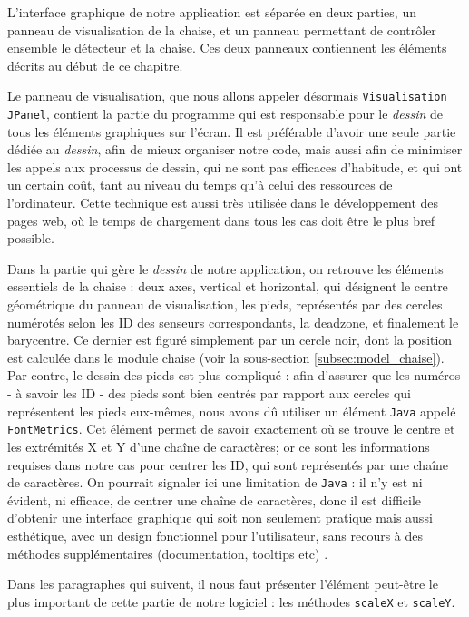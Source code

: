 \documentclass{polytech/polytech}
\begin{document}
L'interface graphique de notre application est séparée en deux parties, un panneau de visualisation de la chaise, et un panneau permettant de contrôler ensemble le détecteur et la chaise. Ces deux panneaux contiennent les éléments décrits au début de ce chapitre.

Le panneau de visualisation, que nous allons appeler désormais \texttt{Visualisation JPanel}, contient la partie du programme qui est responsable pour le \textit{dessin} de tous les éléments graphiques sur l'écran. Il est préférable d'avoir une seule partie dédiée au \textit{dessin}, afin de mieux organiser notre code, mais aussi afin de minimiser les appels aux processus de dessin, qui ne sont pas efficaces d’habitude, et qui ont un certain coût, tant au niveau du temps qu’à celui des ressources de l'ordinateur. Cette technique est aussi très utilisée dans le développement des pages web, où le temps de chargement dans tous les cas doit être le plus bref possible.

Dans la partie qui gère le \textit{dessin} de notre application, on retrouve les éléments essentiels de la chaise : deux axes, vertical et horizontal, qui désignent le centre géométrique du panneau de visualisation, les pieds, représentés par des cercles numérotés selon les ID des senseurs correspondants, la deadzone, et finalement le barycentre. Ce dernier est figuré simplement par un cercle noir, dont la position est calculée dans le module chaise (voir la sous-section \ref{subsec:model_chaise}). Par contre, le dessin des pieds est plus compliqué : afin d’assurer que les numéros - à savoir les ID - des pieds sont bien centrés par rapport aux cercles qui représentent les pieds eux-mêmes, nous avons dû utiliser un élément \texttt{Java} appelé \texttt{FontMetrics}. Cet élément permet de savoir exactement où se trouve le centre et les extrémités X et Y d'une chaîne de caractères; or ce sont les informations requises dans notre cas pour centrer les ID, qui sont représentés par une chaîne de caractères. On pourrait signaler ici une limitation de \texttt{Java} : il n’y est ni évident, ni efficace, de centrer une chaîne de caractères, donc il est difficile d’obtenir une interface graphique qui soit non seulement pratique mais aussi esthétique, avec un design fonctionnel pour l'utilisateur, sans recours à des méthodes supplémentaires (documentation, tooltips etc) .

Dans les paragraphes qui suivent, il nous faut présenter l'élément peut-être le plus important de cette partie de notre logiciel : les méthodes \texttt{scaleX} et \texttt{scaleY}.
\end{document}
